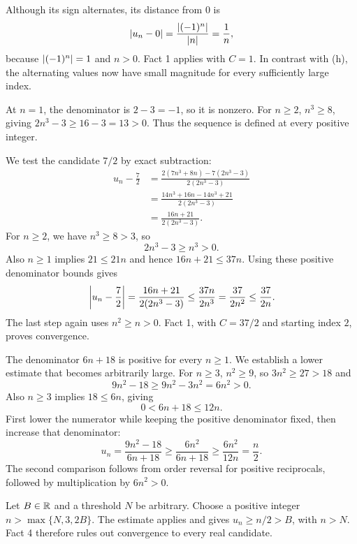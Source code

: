 
Although its sign alternates, its distance from $0$ is
\[
 \left|u_n-0\right|
 =\frac{\left|(-1)^n\right|}{\left|n\right|}
 =\frac1n,
\]
because $\left|(-1)^n\right|=1$ and $n>0$. Fact 1 applies with
$C=1$. In contrast with (h), the alternating values now have
small magnitude for every sufficiently large index.


At $n=1$, the denominator is $2-3=-1$, so it is nonzero.
For $n\geq2$, $n^3\geq8$, giving
$2n^3-3\geq16-3=13>0$. Thus the sequence is defined at every
positive integer.

We test the candidate $7/2$ by exact subtraction:
\begin{align*}
 u_n-\frac72
 &=\frac{2(7n^3+8n)-7(2n^3-3)}{2(2n^3-3)}\\
 &=\frac{14n^3+16n-14n^3+21}{2(2n^3-3)}\\
 &=\frac{16n+21}{2(2n^3-3)}.
\end{align*}
For $n\geq2$, we have $n^3\geq8>3$, so
\[
 2n^3-3\geq n^3>0.
\]
Also $n\geq1$ implies $21\leq21n$ and hence
$16n+21\leq37n$. Using these positive denominator bounds gives
\[
 \left|u_n-\frac72\right|
 =\frac{16n+21}{2(2n^3-3)}
 \leq\frac{37n}{2n^3}
 =\frac{37}{2n^2}
 \leq\frac{37}{2n}.
\]
The last step again uses $n^2\geq n>0$. Fact 1, with
$C=37/2$ and starting index $2$, proves convergence.


The denominator $6n+18$ is positive for every $n\geq1$.
We establish a lower estimate that becomes arbitrarily large.
For $n\geq3$, $n^2\geq9$, so $3n^2\geq27>18$ and
\[
 9n^2-18\geq9n^2-3n^2=6n^2>0.
\]
Also $n\geq3$ implies $18\leq6n$, giving
\[
 0<6n+18\leq12n.
\]
First lower the numerator while keeping the positive denominator
fixed, then increase that denominator:
\[
 u_n=\frac{9n^2-18}{6n+18}
 \geq\frac{6n^2}{6n+18}
 \geq\frac{6n^2}{12n}
 =\frac n2.
\]
The second comparison follows from order reversal for positive
reciprocals, followed by multiplication by $6n^2>0$.

Let $B\in\mathbb{R}$ and a threshold $N$ be arbitrary. Choose a positive
integer $n>\max\{N,3,2B\}$. The estimate applies and gives
$u_n\geq n/2>B$, with $n>N$. Fact 4 therefore rules out
convergence to every real candidate.

